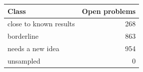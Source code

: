 \begin{tabular}{@{}lr@{}}
\toprule
Class & Open problems \\
\midrule
close to known results & 268 \\
borderline & 863 \\
needs a new idea & 954 \\
unsampled & 0 \\
\bottomrule
\end{tabular}
